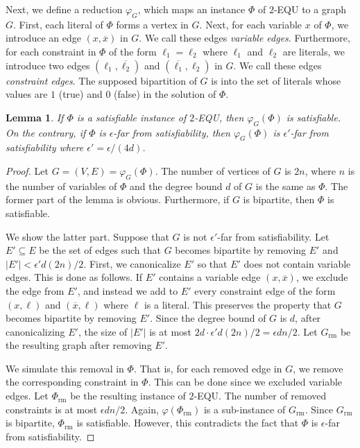 \documentclass[letterpaper,11pt]{article}
\newtheorem{lemma}[theorem]{Lemma}
\newcommand{\equ}{\textsf{EQU}\xspace}
\begin{document}
Next,
we define a reduction $\varphi_G$, which maps an instance $\Phi$ of $2$-\equ to a graph $G$.
First, each literal of $\Phi$ forms a vertex in $G$.
Next, for each variable $x$ of $\Phi$, 
we introduce an edge $(x,\overline{x})$ in $G$.
We call these edges \textit{variable edges}.
Furthermore, 
for each constraint in $\Phi$ of the form $\ell_1=\ell_2$ where $\ell_1$ and $\ell_2$ are literals,
we introduce two edges $(\ell_1,\overline{\ell_2})$ and $(\overline{\ell_1},\ell_2)$ in $G$.
We call these edges \textit{constraint edges}.
The supposed bipartition of $G$ is into the set of literals whose values are $1$ (true) and $0$ (false) in the solution of $\Phi$.

\begin{lemma}\label{lmm:reduction-from-2eq}
  If $\Phi$ is a satisfiable instance of \textsf{$2$-\equ},
  then $\varphi_G(\Phi)$ is satisfiable.
  On the contrary, if $\Phi$ is $\epsilon$-far from satisfiability,
  then $\varphi_G(\Phi)$ is $\epsilon'$-far from satisfiability where $\epsilon'=\epsilon/(4d)$.
\end{lemma}
\begin{proof}
  Let $G=(V,E)=\varphi_G(\Phi)$.
  The number of vertices of $G$ is $2n$,
  where $n$ is the number of variables of $\Phi$ and the degree bound $d$ of $G$ is the same as $\Phi$.
  The former part of the lemma is obvious.
  Furthermore, if $G$ is bipartite, then $\Phi$ is satisfiable.
  
  We show the latter part.
  Suppose that $G$ is not $\epsilon'$-far from satisfiability.
  Let $E'\subseteq E$ be the set of edges such that $G$ becomes bipartite by removing $E'$ and $|E'|<\epsilon' d (2n)/2$.
  First, we canonicalize $E'$ so that $E'$ does not contain variable edges.
  This is done as follows.
  If $E'$ contains a variable edge $(x,\overline{x})$,
  we exclude the edge from $E'$,
  and instead we add to $E'$ every constraint edge of the form $(x,\ell)$ and $(\overline{x},\ell)$ where $\ell$ is a literal.
  This preserves the property that $G$ becomes bipartite by removing $E'$.
  Since the degree bound of $G$ is $d$,
  after canonicalizing $E'$, 
  the size of $|E'|$ is at most $2d\cdot \epsilon' d (2n)/2=\epsilon dn/2$.
  Let $G_{\textrm{rm}}$ be the resulting graph after removing $E'$.

  We simulate this removal in $\Phi$.
  That is, for each removed edge in $G$,
  we remove the corresponding constraint in $\Phi$.
  This can be done since we excluded variable edges.
  Let $\Phi_{\textrm{rm}}$ be the resulting instance of $2$-\equ.
  The number of removed constraints is at most $\epsilon dn/2$.
  Again, $\varphi(\Phi_{\textrm{rm}})$ is a sub-instance of $G_{\textrm{rm}}$.
  Since $G_{\textrm{rm}}$ is bipartite, 
  $\Phi_{\textrm{rm}}$ is satisfiable.
  However, this contradicts the fact that $\Phi$ is $\epsilon$-far from satisfiability.
\end{proof}
\end{document}
